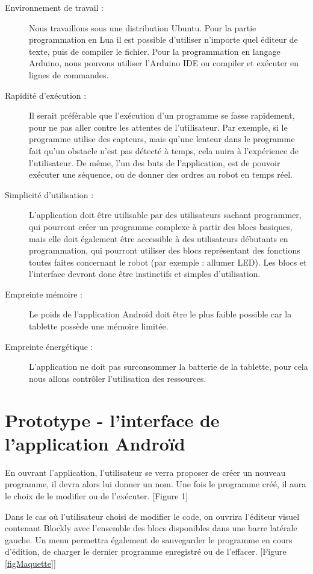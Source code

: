 \documentclass[12pt,francais]{report}
\begin{document}
\begin{description}
	\item [Environnement de travail :]Nous travaillons sous une distribution Ubuntu. Pour la partie programmation en Lua\cite{refLua} il est possible d'utiliser n'importe quel éditeur de texte, puis de compiler le fichier. Pour la programmation en langage Arduino, nous pouvons utiliser l'Arduino IDE ou compiler et exécuter en lignes de commandes.
	\item [Rapidité d'exécution :] Il serait préférable que l'exécution d'un programme se fasse rapidement, pour ne pas aller contre les attentes de l'utilisateur. Par exemple, si le programme utilise des capteurs, mais qu'une lenteur dans le programme fait qu'un obstacle n'est pas détecté à temps, cela nuira à l'expérience de l'utilisateur. De même, l'un des buts de l'application, est de pouvoir exécuter une séquence, ou de donner des ordres au robot en temps réel. 
	\item [Simplicité d'utilisation : ]L'application doit être utilisable par des utilisateurs sachant programmer, qui pourront créer un programme complexe à partir des blocs basiques, mais elle doit également être accessible à des utilisateurs débutants en programmation, qui pourront utiliser des blocs représentant des fonctions toutes faites concernant le robot (par exemple : allumer LED). Les blocs et l'interface devront donc être instinctifs et simples d'utilisation.
	\item [Empreinte mémoire :] Le poids de l'application Androïd doit être le plus faible possible car la tablette possède une mémoire limitée.
	\item [Empreinte énergétique :] L'application ne doit pas surconsommer la batterie de la tablette, pour cela nous allons contrôler l'utilisation des ressources.
\end{description}

\section*{Prototype - l'interface de l'application Androïd }
En ouvrant l'application, l'utilisateur se verra proposer de créer un nouveau programme, il devra alors lui donner un nom. Une fois le programme créé, il aura le choix de le modifier ou de l'exécuter. [Figure 1]

Dans le cas où l'utilisateur choisi de modifier le code, on ouvrira l'éditeur visuel contenant Blockly avec l'ensemble des blocs disponibles dans une barre latérale gauche. Un menu permettra également de sauvegarder le programme en cours d'édition, de charger le dernier programme enregistré ou de l'effacer. [Figure \ref{figMaquette}]\\
\end{document}

